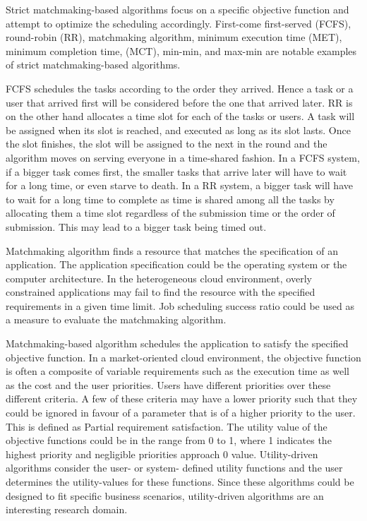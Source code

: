 \documentclass[times, 10pt,twocolumn]{article}
\begin{document}
Strict matchmaking-based algorithms focus on a specific objective function and attempt to optimize the scheduling accordingly. First-come first-served (FCFS), round-robin (RR), matchmaking algorithm, minimum execution time (MET), minimum completion time, (MCT), min-min, and max-min\cite{heuristics} are notable examples of strict matchmaking-based algorithms. 

FCFS schedules the tasks according to the order they arrived. Hence a task or a user that arrived first will be considered before the one that arrived later. RR is on the other hand allocates a time slot for each of the tasks or users. A task will be assigned when its slot is reached, and executed as long as its slot lasts. Once the slot finishes, the slot will be assigned to the next in the round and the algorithm moves on serving everyone in a time-shared fashion. In a FCFS system, if a bigger task comes first, the smaller tasks that arrive later will have to wait for a long time, or even starve to death. In a RR system, a bigger task will have to wait for a long time to complete as time is shared among all the tasks by allocating them a time slot regardless of the submission time or the order of submission. This may lead to a bigger task being timed out.

Matchmaking algorithm finds a resource that matches the specification of an application. The application specification could be the operating system or the computer architecture. In the heterogeneous cloud environment, overly constrained applications may fail to find the resource with the specified requirements in a given time limit. Job scheduling success ratio could be used as a measure to evaluate the matchmaking algorithm. 

Matchmaking-based algorithm schedules the application to satisfy the specified objective function. In a market-oriented cloud environment, the objective function is often a composite of variable requirements such as the execution time as well as the cost and the user priorities. Users have different priorities over these different criteria. A few of these criteria may have a lower priority such that they could be ignored in favour of a parameter that is of a higher priority to the user. This is defined as Partial requirement satisfaction. The utility value of the objective functions could be in the range from 0 to 1, where 1 indicates the highest priority and negligible priorities approach 0 value. Utility-driven algorithms consider the user- or system- defined utility functions and the user determines the utility-values for these functions. Since these algorithms could be designed to fit specific business scenarios, utility-driven algorithms are an interesting research domain.
\end{document}
